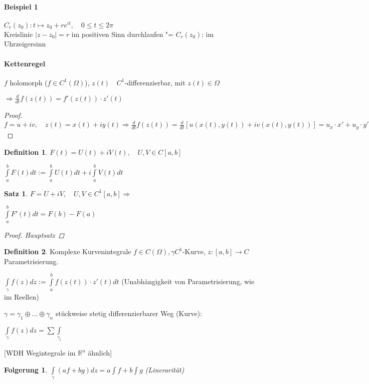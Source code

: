\documentclass[ngerman,halfparskip]{scrartcl}
\newtheorem{satz}{Satz}[section]
\newtheorem{folg}{Folgerung}[section]
\theoremstyle{definition}
\newtheorem{defin}{Definition}[section]
\def\R{\mathbb R}
\begin{document}
\paragraph{Beispiel 1} $C_r(z_0): t\mapsto z_0+re^{it}, \quad 0\leq
t\leq 2\pi$ \\
Kreislinie $|z-z_0|=r$ im positiven Sinn durchlaufen "= $C_r(z_0)$: im Uhrzeigersinn

\paragraph*{Kettenregel} $f$ holomorph ($f\in C^1(\Omega)$), $z(t) \quad C^1$-differenzierbar, mit $z(t)\in\Omega$ 

$\Rightarrow \frac d {dt} f(z(t))=f'(z(t))\cdot z'(t)$
\begin{proof}
$f=u+iv,\quad z(t)=x(t)+iy(t) \Rightarrow \frac d {dt} f(z(t))=\frac d {dt}\left [u(x(t),y(t))+iv(x(t),y(t)) \right]=u_x\cdot x'+u_y \cdot y'+i\left(v_x\cdot x' + v_y \cdot y' \right ) = (u_x+iv_x)(x'+iv')=f'(z(t))\cdot z'(t)$ 
\end{proof}

\begin{defin}
$F(t)=U(t)+iV(t),\quad U,V\in C[a,b]$

$\int\limits_a^bF(t)dt:=\int\limits_a^bU(t)dt+i\int\limits_a^bV(t)dt$
\end{defin}

\begin{satz}
$F=U+iV, \quad U,V\in C^1[a,b] \Rightarrow $

$\int\limits_a^bF'(t)dt=F(b)-F(a)$
\begin{proof}
Hauptsatz
\end{proof}
\end{satz}

\begin{defin}{Komplexe Kurvenintegrale} $f\in C(\Omega), \gamma C^1$-Kurve, $z:[a,b]\rightarrow C$ Parametrisierung.

$\int\limits_\gamma f(z)dz:=\int\limits_a^bf(z(t))\cdot z'(t)dt$ (Unabhängigkeit von Parametrisierung, wie im Reellen)

$\gamma= \gamma_1\oplus \ldots \oplus \gamma_n$ stückweise stetig differenzierbarer Weg (Kurve):

$\int\limits_\gamma f(z)dz=\sum\int\limits_{\gamma_i}$
\end{defin}

[WDH Wegintegrale im $\R^n$ ähnlich]

\begin{folg} $\int\limits_\gamma(af+bg)dz=a\int f+b\int g$ (Linerarität)\end{folg}
\end{document}
